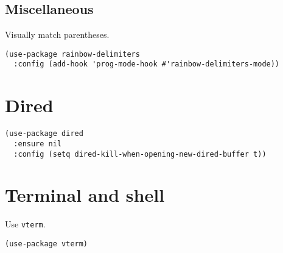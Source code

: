 \documentclass[11pt]{article}
\begin{document}
\subsection{Miscellaneous}
\label{sec:org5b3b2ba}
Visually match parentheses.
\begin{verbatim}
(use-package rainbow-delimiters
  :config (add-hook 'prog-mode-hook #'rainbow-delimiters-mode))
\end{verbatim}

\section{Dired}
\label{sec:orgfe5cd44}
\begin{verbatim}
(use-package dired
  :ensure nil
  :config (setq dired-kill-when-opening-new-dired-buffer t))
\end{verbatim}

\section{Terminal and shell}
\label{sec:orga69d575}
Use \texttt{vterm}.
\begin{verbatim}
(use-package vterm)
\end{verbatim}
\end{document}
